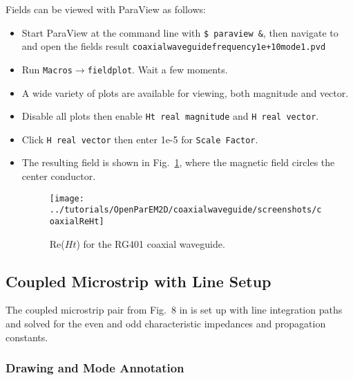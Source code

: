 \documentclass[titlepage]{article}
\renewcommand\_{\textunderscore\linebreak[1]}
\begin{document}
Fields can be viewed with ParaView as follows:
\begin{itemize}
\item Start ParaView at the command line with \verb+$ paraview &+, then navigate to and open the fields result \newline \texttt{coaxial\_waveguide\_frequency\_1e+10\_mode\_1.pvd}
\item Run \texttt{Macros}$\rightarrow$\texttt{field\_plot}.  Wait a few moments.
\item A wide variety of plots are available for viewing, both magnitude and vector.
\item Disable all plots then enable \texttt{Ht real magnitude} and \texttt{H real vector}.
\item Click \texttt{H real vector} then enter 1e-5 for \texttt{Scale Factor}.
\item The resulting field is shown in Fig.~\ref{fig:coaxial_ReHt}, where the magnetic field circles the center conductor.
\begin{figure}[H]
  \centering
  \texttt{[image: ../tutorials/OpenParEM2D/coaxial\_waveguide/screenshots/coaxial\_ReHt]}
  \caption{Re($Ht$) for the RG401 coaxial waveguide.}
  \label{fig:coaxial_ReHt}
\end{figure}
\end{itemize}

\subsection{Coupled Microstrip with Line Setup}
\label{sec:coupled_microstrip}

The coupled microstrip pair from Fig.~8 in \cite{Olyslager} is set up with line integration paths and solved for the even and odd characteristic impedances and propagation constants.

\subsubsection{Drawing and Mode Annotation}
\end{document}
